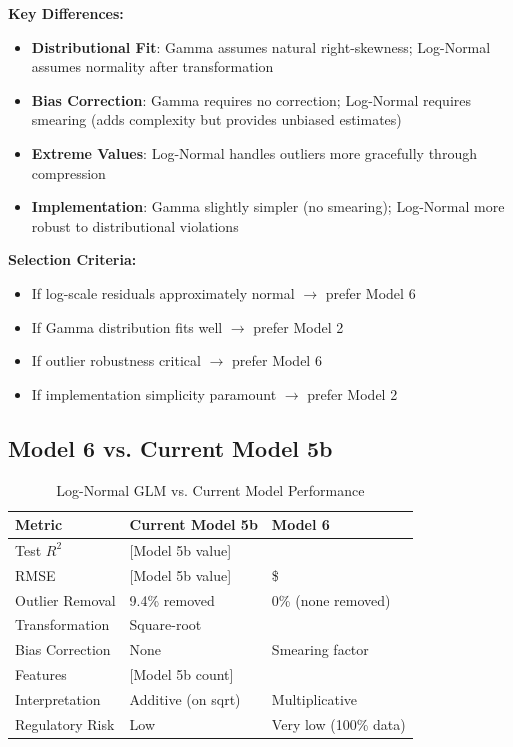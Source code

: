 \textbf{Key Differences:}

\begin{itemize}
    \item \textbf{Distributional Fit}: Gamma assumes natural right-skewness; Log-Normal assumes normality after transformation
    \item \textbf{Bias Correction}: Gamma requires no correction; Log-Normal requires smearing (adds complexity but provides unbiased estimates)
    \item \textbf{Extreme Values}: Log-Normal handles outliers more gracefully through compression
    \item \textbf{Implementation}: Gamma slightly simpler (no smearing); Log-Normal more robust to distributional violations
\end{itemize}

\textbf{Selection Criteria:}
\begin{itemize}
    \item If log-scale residuals approximately normal $\rightarrow$ prefer Model 6
    \item If Gamma distribution fits well $\rightarrow$ prefer Model 2
    \item If outlier robustness critical $\rightarrow$ prefer Model 6
    \item If implementation simplicity paramount $\rightarrow$ prefer Model 2
\end{itemize}

\subsection{Model 6 vs. Current Model 5b}

\begin{table}[h]
\centering
\caption{Log-Normal GLM vs. Current Model Performance}
\begin{tabular}{lll}
\toprule
\textbf{Metric} & \textbf{Current Model 5b} & \textbf{Model 6} \\
\midrule
Test $R^2$ & [Model 5b value] & \ModelSixRSquaredTest{} \\
RMSE & [Model 5b value] & \$\ModelSixRMSETest{} \\
Outlier Removal & 9.4\% removed & 0\% (none removed) \\
Transformation & Square-root & \ModelSixTransformation{} \\
Bias Correction & None & Smearing factor \\
Features & [Model 5b count] & \ModelSixNumFeatures{} \\
Interpretation & Additive (on sqrt) & Multiplicative \\
Regulatory Risk & Low & Very low (100\% data) \\
\bottomrule
\end{tabular}
\end{table}

